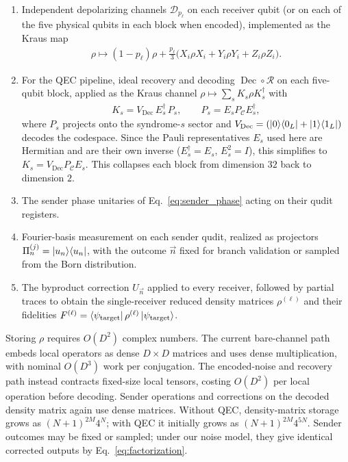 \documentclass[aps,physrev,10pt,twocolumn,superscriptaddress,floatfix]{revtex4-2}
\DeclareMathOperator{\Dec}{Dec}
\begin{document}
\begin{enumerate}
    \item Independent depolarizing channels $\mathcal{D}_{p_\ell}$ on each receiver qubit (or on each of the five physical qubits in each block when encoded), implemented as the Kraus map
    \begin{align}
        \rho \mapsto (1-p_\ell)\rho + \tfrac{p_\ell}{3}\big(X_i\rho X_i + Y_i\rho Y_i + Z_i\rho Z_i\big).
    \end{align}
    \item For the QEC pipeline, ideal recovery and decoding $\Dec\circ\mathcal{R}$ on each five-qubit block, applied as the Kraus channel $\rho \mapsto \sum_s K_s \rho K_s^\dagger$ with
    \begin{align}
        K_s = V_{\mathrm{Dec}}\, E_s^\dagger\, P_s, \qquad P_s = E_s P_{\mathcal{C}} E_s^\dagger,
    \end{align}
    where $P_s$ projects onto the syndrome-$s$ sector and $V_{\mathrm{Dec}} = (\ket{0}\!\bra{0_L} + \ket{1}\!\bra{1_L})$ decodes the codespace. Since the Pauli representatives $E_s$ used here are Hermitian and are their own inverse ($E_s^\dagger=E_s$, $E_s^2=I$), this simplifies to $K_s = V_{\mathrm{Dec}} P_{\mathcal{C}} E_s$. This collapses each block from dimension $32$ back to dimension $2$.
    \item The sender phase unitaries of Eq.~\eqref{eq:sender_phase} acting on their qudit registers.
    \item Fourier-basis measurement on each sender qudit, realized as projectors $\Pi_n^{(j)} = \ket{u_n}\!\bra{u_n}$, with the outcome $\vec{n}$ fixed for branch validation or sampled from the Born distribution.
    \item The byproduct correction $U_{\vec{n}}$ applied to every receiver, followed by partial traces to obtain the single-receiver reduced density matrices $\rho^{(\ell)}$ and their fidelities $F^{(\ell)} = \bra{\psi_{\mathrm{target}}}\rho^{(\ell)}\ket{\psi_{\mathrm{target}}}$.
\end{enumerate}

Storing $\rho$ requires $O(D^2)$ complex numbers. The current bare-channel path embeds local operators as dense $D\times D$ matrices and uses dense multiplication, with nominal $O(D^3)$ work per conjugation. The encoded-noise and recovery path instead contracts fixed-size local tensors, costing $O(D^2)$ per local operation before decoding. Sender operations and corrections on the decoded density matrix again use dense matrices. Without QEC, density-matrix storage grows as $(N+1)^{2M}4^N$; with QEC it initially grows as $(N+1)^{2M}4^{5N}$. Sender outcomes may be fixed or sampled; under our noise model, they give identical corrected outputs by Eq.~\eqref{eq:factorization}.
\end{document}
